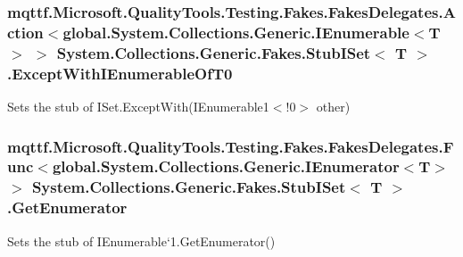 \hypertarget{class_system_1_1_collections_1_1_generic_1_1_fakes_1_1_stub_i_set_3_01_t_01_4_a0e8de6748c9c9bd4959a514322c5c7e8}{
\subsubsection[{Except\-With\-I\-Enumerable\-Of\-T0}]{\setlength{\rightskip}{0pt plus 5cm}mqttf.\-Microsoft.\-Quality\-Tools.\-Testing.\-Fakes.\-Fakes\-Delegates.\-Action$<$global.\-System.\-Collections.\-Generic.\-I\-Enumerable$<$T$>$ $>$ System.\-Collections.\-Generic.\-Fakes.\-Stub\-I\-Set$<$ T $>$.Except\-With\-I\-Enumerable\-Of\-T0}}\label{class_system_1_1_collections_1_1_generic_1_1_fakes_1_1_stub_i_set_3_01_t_01_4_a0e8de6748c9c9bd4959a514322c5c7e8}


Sets the stub of I\-Set{.\-Except\-With(I\-Enumerable}1$<$!0$>$ other)

\hypertarget{class_system_1_1_collections_1_1_generic_1_1_fakes_1_1_stub_i_set_3_01_t_01_4_a6d13949159719640da31f7e1a8c9f2d8}{
\subsubsection[{Get\-Enumerator}]{\setlength{\rightskip}{0pt plus 5cm}mqttf.\-Microsoft.\-Quality\-Tools.\-Testing.\-Fakes.\-Fakes\-Delegates.\-Func$<$global.\-System.\-Collections.\-Generic.\-I\-Enumerator$<$T$>$ $>$ System.\-Collections.\-Generic.\-Fakes.\-Stub\-I\-Set$<$ T $>$.Get\-Enumerator}}\label{class_system_1_1_collections_1_1_generic_1_1_fakes_1_1_stub_i_set_3_01_t_01_4_a6d13949159719640da31f7e1a8c9f2d8}


Sets the stub of I\-Enumerable`1.Get\-Enumerator()

